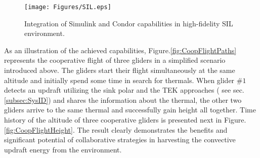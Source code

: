 \documentclass{ifacconf}
\begin{document}
\begin{figure}[thpb]
  \centering
  \texttt{[image: Figures/SIL.eps]}
  \caption{Integration of Simulink and Condor capabilities in high-fidelity SIL environment.}
  \label{fig:SIL}
\end{figure}

%
%

As an illustration of the achieved capabilities, Figure.\ref{fig:CoopFlightPaths}
represents the cooperative flight of three gliders in a simplified scenario introduced
above. The gliders start their flight simultaneously at the same altitude and initially
spend some time in search for thermals. When glider $\#1$ detects an updraft utilizing
the sink polar and the TEK approaches ( see sec.\ref{subsec:SysID}) and shares the
information about the thermal, the other two gliders arrive to the same thermal and
successfully gain height all together. Time history of the altitude of three cooperative
gliders is presented next in Figure.\ref{fig:CoopFlightHeight}. The result clearly
demonstrates the benefits and significant potential of collaborative strategies in
harvesting the convective updraft energy from the environment.
\end{document}

